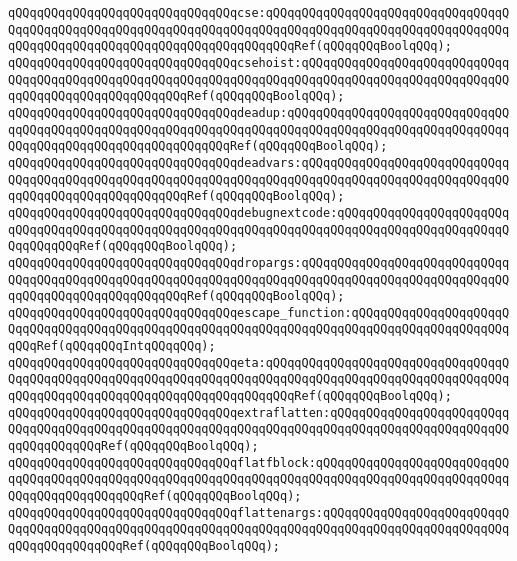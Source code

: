 \verb|qQQqqQQqqQQqqQQqqQQqqQQqqQQqqQQqcse:qQQqqQQqqQQqqQQqqQQqqQQqqQQqqQQqqQQqqQQqqQQqqQQqqQQqqQQqqQQqqQQqqQQqqQQqqQQqqQQqqQQqqQQqqQQqqQQqqQQqqQQqqQQqqQQqqQQqqQQqqQQqqQQqqQQqqQQqqQQqqQQqRef(qQQqqQQqBoolqQQq);|\newline
\verb|qQQqqQQqqQQqqQQqqQQqqQQqqQQqqQQqcsehoist:qQQqqQQqqQQqqQQqqQQqqQQqqQQqqQQqqQQqqQQqqQQqqQQqqQQqqQQqqQQqqQQqqQQqqQQqqQQqqQQqqQQqqQQqqQQqqQQqqQQqqQQqqQQqqQQqqQQqqQQqqQQqRef(qQQqqQQqBoolqQQq);|\newline
\verb|qQQqqQQqqQQqqQQqqQQqqQQqqQQqqQQqdeadup:qQQqqQQqqQQqqQQqqQQqqQQqqQQqqQQqqQQqqQQqqQQqqQQqqQQqqQQqqQQqqQQqqQQqqQQqqQQqqQQqqQQqqQQqqQQqqQQqqQQqqQQqqQQqqQQqqQQqqQQqqQQqqQQqqQQqRef(qQQqqQQqBoolqQQq);|\newline
\verb|qQQqqQQqqQQqqQQqqQQqqQQqqQQqqQQqdeadvars:qQQqqQQqqQQqqQQqqQQqqQQqqQQqqQQqqQQqqQQqqQQqqQQqqQQqqQQqqQQqqQQqqQQqqQQqqQQqqQQqqQQqqQQqqQQqqQQqqQQqqQQqqQQqqQQqqQQqqQQqqQQqRef(qQQqqQQqBoolqQQq);|\newline
\verb|qQQqqQQqqQQqqQQqqQQqqQQqqQQqqQQqdebugnextcode:qQQqqQQqqQQqqQQqqQQqqQQqqQQqqQQqqQQqqQQqqQQqqQQqqQQqqQQqqQQqqQQqqQQqqQQqqQQqqQQqqQQqqQQqqQQqqQQqqQQqqQQqRef(qQQqqQQqBoolqQQq);|\newline
\verb|qQQqqQQqqQQqqQQqqQQqqQQqqQQqqQQqdropargs:qQQqqQQqqQQqqQQqqQQqqQQqqQQqqQQqqQQqqQQqqQQqqQQqqQQqqQQqqQQqqQQqqQQqqQQqqQQqqQQqqQQqqQQqqQQqqQQqqQQqqQQqqQQqqQQqqQQqqQQqqQQqRef(qQQqqQQqBoolqQQq);|\newline
\newline
\verb|qQQqqQQqqQQqqQQqqQQqqQQqqQQqqQQqescape_function:qQQqqQQqqQQqqQQqqQQqqQQqqQQqqQQqqQQqqQQqqQQqqQQqqQQqqQQqqQQqqQQqqQQqqQQqqQQqqQQqqQQqqQQqqQQqqQQqRef(qQQqqQQqIntqQQqqQQq);|\newline
\newline
\verb|qQQqqQQqqQQqqQQqqQQqqQQqqQQqqQQqeta:qQQqqQQqqQQqqQQqqQQqqQQqqQQqqQQqqQQqqQQqqQQqqQQqqQQqqQQqqQQqqQQqqQQqqQQqqQQqqQQqqQQqqQQqqQQqqQQqqQQqqQQqqQQqqQQqqQQqqQQqqQQqqQQqqQQqqQQqqQQqqQQqRef(qQQqqQQqBoolqQQq);|\newline
\verb|qQQqqQQqqQQqqQQqqQQqqQQqqQQqqQQqextraflatten:qQQqqQQqqQQqqQQqqQQqqQQqqQQqqQQqqQQqqQQqqQQqqQQqqQQqqQQqqQQqqQQqqQQqqQQqqQQqqQQqqQQqqQQqqQQqqQQqqQQqqQQqqQQqRef(qQQqqQQqBoolqQQq);|\newline
\verb|qQQqqQQqqQQqqQQqqQQqqQQqqQQqqQQqflatfblock:qQQqqQQqqQQqqQQqqQQqqQQqqQQqqQQqqQQqqQQqqQQqqQQqqQQqqQQqqQQqqQQqqQQqqQQqqQQqqQQqqQQqqQQqqQQqqQQqqQQqqQQqqQQqqQQqqQQqRef(qQQqqQQqBoolqQQq);|\newline
\verb|qQQqqQQqqQQqqQQqqQQqqQQqqQQqqQQqflattenargs:qQQqqQQqqQQqqQQqqQQqqQQqqQQqqQQqqQQqqQQqqQQqqQQqqQQqqQQqqQQqqQQqqQQqqQQqqQQqqQQqqQQqqQQqqQQqqQQqqQQqqQQqqQQqqQQqRef(qQQqqQQqBoolqQQq);|\newline
